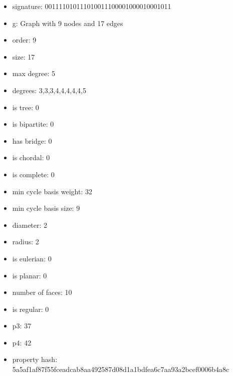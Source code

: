 \newpage
\begin{figure}
\end{figure}
\begin{itemize}
\item signature: 001111010111010011100001000010001011
\item g: Graph with 9 nodes and 17 edges
\item order: 9
\item size: 17
\item max degree: 5
\item degrees: 3,3,3,4,4,4,4,4,5
\item is tree: 0
\item is bipartite: 0
\item has bridge: 0
\item is chordal: 0
\item is complete: 0
\item min cycle basis weight: 32
\item min cycle basis size: 9
\item diameter: 2
\item radius: 2
\item is eulerian: 0
\item is planar: 0
\item number of faces: 10
\item is regular: 0
\item p3: 37
\item p4: 42
\item property hash: 5a5af1af87f55fceadcab8aa492587d08d1a1bdfea6c7aa93a2bcef0006b4a8c
\end{itemize}
